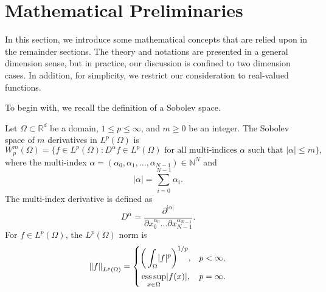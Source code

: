 \section{Mathematical Preliminaries}
In this section, we introduce some mathematical concepts that are relied upon in the
remainder sections. The theory and notations are presented in a general dimension
sense, but in practice, our discussion is confined to two dimension cases.
In addition, for simplicity,
we restrict our consideration to real-valued functions. 

To begin with, we recall the definition of a Sobolev space.
\begin{defn}\label{def:sobolevspace}
Let $\Omega \subset \mathbb{R}^d$ be a domain, $1\leq p \leq \infty$, and 
$m \geq 0$ be an integer. The Sobolev space of $m$ derivatives in $L^p(\Omega)$ is
\begin{equation}
W^m_p(\Omega) = \{f \in L^p(\Omega): D^\alpha f \in L^p(\Omega) \text{ for all multi-indices $\alpha$ such that } \lvert \alpha \rvert \leq m \},
\end{equation}
where the multi-index $\alpha = (\alpha_0, \alpha_1, \ldots, \alpha_{N-1}) \in \mathbb{N}^N$ and
\begin{equation*}
\lvert \alpha \rvert = \sum_{i=0}^{N-1} \alpha_i.
\end{equation*}
The multi-index derivative is defined as
\begin{equation*}
D^\alpha = \frac{\partial^{\lvert \alpha \rvert} }{ \partial x_0^{\alpha_0} \ldots \partial x_{N-1}^{\alpha_{N-1}} }.
\end{equation*}
For $f \in L^p(\Omega)$, the $L^p(\Omega)$ norm is
\begin{equation}
		  \left\lVert f\right\rVert_{L^p(\Omega)} = \left \{ 
		  \begin{alignedat}{2}
					 &\bigg( \int_{\Omega} \lvert f \rvert^p \bigg)^{1/p},\quad &&p<\infty,\\
					 &\operatorname*{ess\,sup}_{x\in\Omega} \lvert f(x) \rvert, && p=\infty.
		  \end{alignedat}
		  \right.
\end{equation}
\end{defn}

